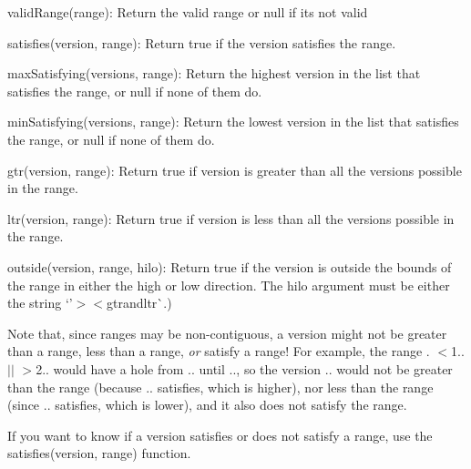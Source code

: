 \begin{DoxyItemize}
\item {\ttfamily valid\+Range(range)}\+: Return the valid range or null if it\textquotesingle{}s not valid
\item {\ttfamily satisfies(version, range)}\+: Return true if the version satisfies the range.
\item {\ttfamily max\+Satisfying(versions, range)}\+: Return the highest version in the list that satisfies the range, or {\ttfamily null} if none of them do.
\item {\ttfamily min\+Satisfying(versions, range)}\+: Return the lowest version in the list that satisfies the range, or {\ttfamily null} if none of them do.
\item {\ttfamily gtr(version, range)}\+: Return {\ttfamily true} if version is greater than all the versions possible in the range.
\item {\ttfamily ltr(version, range)}\+: Return {\ttfamily true} if version is less than all the versions possible in the range.
\item {\ttfamily outside(version, range, hilo)}\+: Return true if the version is outside the bounds of the range in either the high or low direction. The {\ttfamily hilo} argument must be either the string `'$>$\textquotesingle{}$<$gtr{\ttfamily and}ltr\`{}.)
\end{DoxyItemize}

Note that, since ranges may be non-\/contiguous, a version might not be greater than a range, less than a range, {\itshape or} satisfy a range! For example, the range {. $<$1.. $\vert$$\vert$ $>$2..} would have a hole from {..} until {..}, so the version {..} would not be greater than the range (because {..} satisfies, which is higher), nor less than the range (since {..} satisfies, which is lower), and it also does not satisfy the range.

If you want to know if a version satisfies or does not satisfy a range, use the {\ttfamily satisfies(version, range)} function. 
